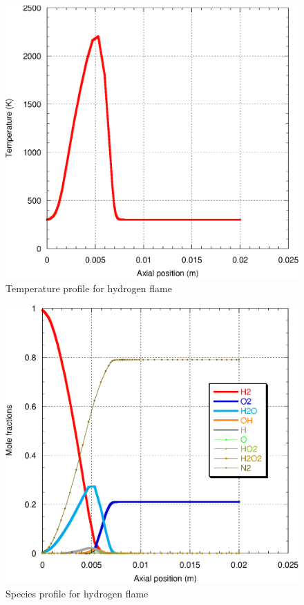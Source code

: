 \begin{figure}[h]
 \centering
\includegraphics[scale=0.6]{temp.eps}
\caption{Temperature profile for hydrogen flame}
\label{temp}
\end{figure}

\begin{figure}[h]
 \centering
\includegraphics[scale=0.6]{counter_profile.eps}
\caption{Species profile for hydrogen flame}
\label{species_profile}
\end{figure}

%
%
%
